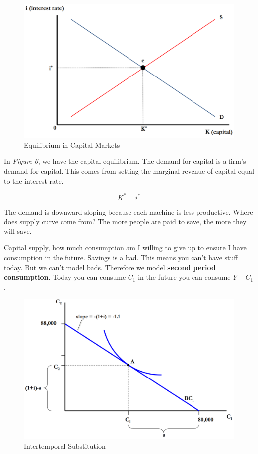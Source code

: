 \documentclass{article}
\begin{document}
\begin{figure}[H]
    \centering
    \includegraphics[scale=0.33]{"Figure 6"}
    \caption{Equilibrium in Capital Markets}
\end{figure}

In \textit{Figure 6}, we have the capital equilibrium. The demand for capital is
a firm's demand for capital. This comes from setting the marginal revenue of
capital equal to the interest rate.

$$K^{*}=i^{*}$$

The demand is downward sloping because each machine is less productive. Where
does supply curve come from? The more people are paid to save, the more they
will save.

Capital supply, how much consumption am I willing to give up to ensure I have
consumption in the future. Savings is a bad. This means you can't have stuff
today. But we can't model bads. Therefore we model \textbf{second period
consumption}. Today you can consume $C_{1}$ in the future you can consume
$Y-C_{1}$.

\begin{figure}[H]
    \centering
    \includegraphics[scale=0.33]{"Figure 7"}
    \caption{Intertemporal Substitution}
\end{figure}
\end{document}
